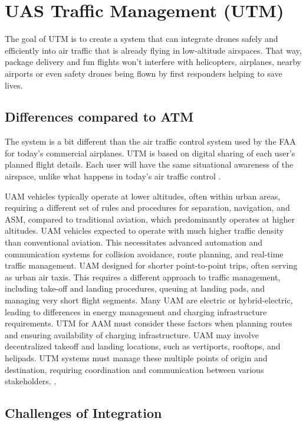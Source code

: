 \section{UAS Traffic Management (UTM)}

The goal of \gls{UTM} is to create a system that can integrate drones safely and efficiently into air traffic that is already flying in low-altitude airspaces. 
That way, package delivery and fun flights won't interfere with helicopters, airplanes, nearby airports or even safety drones being flown by first responders helping to save lives.
\cite{nasa_utm_2021}


\subsection{Differences compared to ATM}

The system is a bit different than the air traffic control system used by the \gls{FAA} for today's commercial airplanes.
UTM is based on digital sharing of each user's planned flight details. 
Each user will have the same situational awareness of the airspace, unlike what happens in today's air traffic control \cite{nasa_utm_2021}.

\Gls{UAM} vehicles typically operate at lower altitudes, often within urban areas, requiring a different set of rules and procedures for separation, navigation, and \gls{ASM}, compared to traditional aviation, which predominantly operates at higher altitudes.
\Gls{UAM} vehicles expected to operate with much higher traffic density than conventional aviation. This necessitates advanced automation and communication systems for collision avoidance, route planning, and real-time traffic management.
\Gls{UAM}  designed for shorter point-to-point trips, often serving as urban air taxis. This requires a different approach to traffic management, including take-off and landing procedures, queuing at landing pads, and managing very short flight segments.
Many \gls{UAM} are electric or hybrid-electric, leading to differences in energy management and charging infrastructure requirements. UTM for AAM must consider these factors when planning routes and ensuring availability of charging infrastructure.
\Gls{UAM} may involve decentralized takeoff and landing locations, such as vertiports, rooftops, and helipads. UTM systems must manage these multiple points of origin and destination, requiring coordination and communication between various stakeholders.
\cite{carc_amc}.


\subsection{Challenges of Integration}

